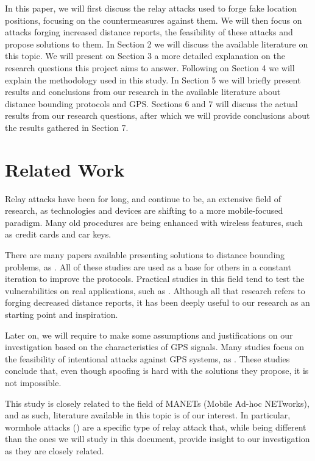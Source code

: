 \documentclass{article}
\begin{document}
In this paper, we will first discuss the relay attacks used to forge fake location positions, focusing on the countermeasures against them. We will then focus on attacks forging increased distance reports, the feasibility of these attacks and propose solutions to them. In Section 2 we will discuss the available literature on this topic. We will present on Section 3 a more detailed explanation on the research questions this project aims to answer. Following on Section 4 we will explain the methodology used in this study. In Section 5 we will briefly present results and conclusions from our research in the available literature about distance bounding protocols and GPS. Sections 6 and 7 will discuss the actual results from our research questions, after which we will provide conclusions about the results gathered in Section 7.

\section{Related Work}

Relay attacks have been for long, and continue to be, an extensive field of research, as technologies and devices are shifting to a more mobile-focused paradigm. Many old procedures are being enhanced with wireless features, such as credit cards and car keys.

There are many papers available presenting solutions to distance bounding problems, as \cite{brands1994distance, tu2007rfid, rasmussen2010realization}. All of these studies are used as a base for others in a constant iteration to improve the protocols. Practical studies in this field tend to test the vulnerabilities on real applications, such as \cite{francillon2011relay, francis2010practical, hancke2005practical, markantonakis2012practical, vandenbreekel2014relay}. Although all that research refers to forging decreased distance reports, it has been deeply useful to our research as an starting point and inspiration.

Later on, we will require to make some assumptions and justifications on our investigation based on the characteristics of GPS signals. Many studies focus on the feasibility of intentional attacks against GPS systems, as \cite{warner2003gps, wen2005countermeasures, jafarnia2012gps}. These studies conclude that, even though spoofing is hard with the solutions they propose, it is not impossible.

This study is closely related to the field of MANETs (Mobile Ad-hoc NETworks), and as such, literature available in this topic is of our interest. In particular, wormhole attacks (\cite{hu2006wormhole, maheshwari2007detecting, goyal2010literature}) are a specific type of relay attack that, while being different than the ones we will study in this document, provide insight to our investigation as they are closely related.
\end{document}

